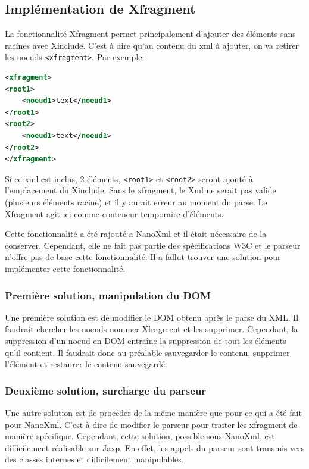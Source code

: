\subsection{Implémentation de Xfragment}
La fonctionnalité Xfragment permet principalement d'ajouter des éléments sans racines avec Xinclude.
C'est à dire qu'au contenu du xml à ajouter, on va retirer les noeuds \verb|<xfragment>|.
Par exemple:
\begin{lstlisting}[language=xml]
<xfragment>
<root1>
	<noeud1>text</noeud1>
</root1>
<root2>
	<noeud1>text</noeud1>
</root2>
</xfragment>
\end{lstlisting}
Si ce xml est inclus, 2 éléments, \verb|<root1>| et \verb|<root2>| seront ajouté à l'emplacement du Xinclude.
Sans le xfragment, le Xml ne serait pas valide (plusieurs éléments racine) et il y aurait erreur au moment du parse.
Le Xfragment agit ici comme conteneur temporaire d'éléments.

Cette fonctionnalité a été rajouté a NanoXml et il était nécessaire de la conserver.
Cependant, elle ne fait pas partie des spécifications W3C et le parseur n'offre pas de base cette fonctionnalité.
Il a fallut trouver une solution pour implémenter cette fonctionnalité.
\subsubsection{Première solution, manipulation du DOM}
Une première solution est de modifier le DOM obtenu après le parse du XML. 
Il faudrait chercher les noeuds nommer Xfragment et les supprimer.
Cependant, la suppression d'un noeud en DOM entraîne la suppression de tout les éléments qu'il contient.
Il faudrait donc au préalable sauvegarder le contenu, supprimer l'élément et restaurer le contenu sauvegardé.
\subsubsection{Deuxième solution, surcharge du parseur}
Une autre solution est de procéder de la même manière que pour ce qui a été fait pour NanoXml.
C'est à dire de modifier le parseur pour traiter les xfragment de manière spécifique.
Cependant, cette solution, possible sous NanoXml, est difficilement réalisable sur Jaxp. 
En effet, les appels du parseur sont transmis vers des classes internes et difficilement manipulables.
